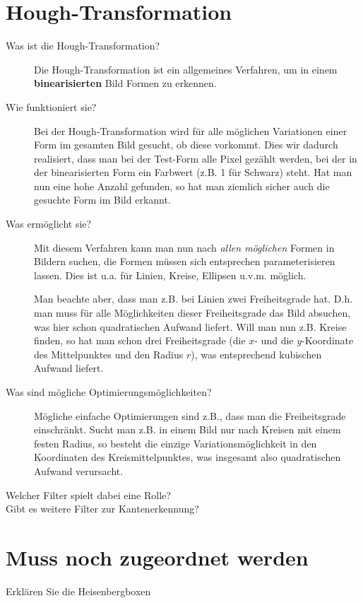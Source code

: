 \section{Hough-Transformation}
\begin{description}
	\item[Was ist die Hough-Transformation?]
      Die Hough-Transformation ist ein allgemeines Verfahren, um in einem \textbf{binearisierten} Bild Formen zu erkennen.
	\item[Wie funktioniert sie?]
      Bei der Hough-Transformation wird für alle möglichen Variationen einer Form im gesamten Bild
      gesucht, ob diese vorkommt. Dies wir dadurch realisiert, dass man bei der Test-Form alle Pixel gezählt
      werden, bei der in der binearisierten Form ein Farbwert (z.B. 1 für Schwarz) steht. Hat man nun eine hohe Anzahl
      gefunden, so hat man ziemlich sicher auch die gesuchte Form im Bild erkannt.
	\item[Was ermöglicht sie?]
      Mit diesem Verfahren kann man nun nach \emph{allen möglichen} Formen in Bildern suchen, die Formen müssen sich 
      entsprechen parameterisieren lassen. Dies ist u.a. für Linien, Kreise, Ellipsen u.v.m. möglich.

      Man beachte aber, dass man z.B. bei Linien zwei Freiheitsgrade hat. D.h. man muss für alle Möglichkeiten dieser
      Freiheitsgrade das Bild absuchen, was hier schon quadratischen Aufwand liefert. Will man nun z.B. Kreise finden,
      so hat man schon drei Freiheitsgrade (die $x$- und die $y$-Koordinate des Mittelpunktes und den Radius $r$), was
      entsprechend kubischen Aufwand liefert.
    \item[Was sind mögliche Optimierungsmöglichkeiten?]
      Mögliche einfache Optimierungen sind z.B., dass man die Freiheitsgrade einschränkt. Sucht man z.B. in einem Bild
      nur nach Kreisen mit einem festen Radius, so besteht die einzige Variationsmöglichkeit in den Koordinaten des
      Kreismittelpunktes, was insgesamt also quadratischen Aufwand verursacht.
	\item[Welcher Filter spielt dabei eine Rolle?]
	\item[Gibt es weitere Filter zur Kantenerkennung?]
\end{description}
\section{Muss noch zugeordnet werden}
\begin{description}
	\item[Erklären Sie die Heisenbergboxen]
\end{description}


